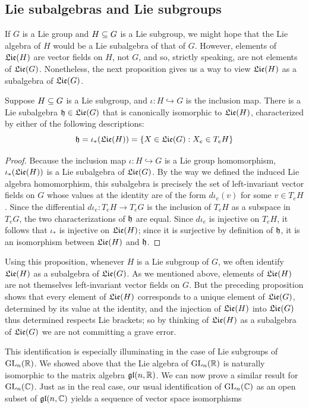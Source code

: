 \subsection{Lie subalgebras and Lie subgroups}
If $G$ is a Lie group and $H\subseteq G$ is a Lie subgroup, we might hope that the Lie algebra of $H$ would be a Lie subalgebra of that of $G$. However, elements of $\mathfrak{Lie}(H)$ are vector fields on $H$, not $G$, and so, strictly speaking, are not elements of $\mathfrak{Lie}(G)$. Nonetheless, the next proposition gives us a way to view $\mathfrak{Lie}(H)$ as a subalgebra of $\mathfrak{Lie}(G)$.
\begin{proposition}\label{Lie subalgebra}
Suppose $H\subseteq G$ is a Lie subgroup, and $\iota:H\hookrightarrow G$ is the inclusion map. There is a Lie subalgebra $\mathfrak{h}\in\mathfrak{Lie}(G)$ that is canonically isomorphic to $\mathfrak{Lie}(H)$, characterized by either of the following descriptions:
\[\mathfrak{h}=\iota_*(\mathfrak{Lie}(H))=\{X\in\mathfrak{Lie}(G):X_e\in T_eH\}\]
\end{proposition}
\begin{proof}
Because the inclusion map $\iota:H\hookrightarrow G$ is a Lie group homomorphism, $\iota_*(\mathfrak{Lie}(H))$ is a Lie subalgebra of $\mathfrak{Lie}(G)$. 
By the way we defined the induced Lie algebra homomorphism, this subalgebra is precisely the set of left-invariant vector fields on $G$ whose values at 
the identity are of the form $d\iota_e(v)$ for some $v\in T_eH$. Since the differential $d\iota_e:T_eH\to T_eG$ is the inclusion of $T_eH$ as a 
subspace in $T_eG$, the two characterizations of $\mathfrak{h}$ are equal. Since $d\iota_e$ is injective on $T_eH$, it follows that $\iota_*$ is injective 
on $\mathfrak{Lie}(H)$; since it is surjective by definition of $\mathfrak{h}$, it is an isomorphism between $\mathfrak{Lie}(H)$ and $\mathfrak{h}$.
\end{proof}
Using this proposition, whenever $H$ is a Lie subgroup of $G$, we often identify $\mathfrak{Lie}(H)$ as a subalgebra of $\mathfrak{Lie}(G)$. 
As we mentioned above, elements of $\mathfrak{Lie}(H)$ are not themselves left-invariant vector fields on $G$. But the preceding 
proposition shows that every element of $\mathfrak{Lie}(H)$ corresponds to a unique element of $\mathfrak{Lie}(G)$, determined by its value at the identity, and 
the injection of $\mathfrak{Lie}(H)$ into $\mathfrak{Lie}(G)$ thus determined respects Lie brackets; so by thinking of $\mathfrak{Lie}(H)$ as a subalgebra of $\mathfrak{Lie}(G)$ we are not 
committing a grave error.\par
This identification is especially illuminating in the case of Lie subgroups of $\mathrm{GL}_n(\mathbb{R})$. We showed above that the Lie algebra of $\mathrm{GL}_n(\mathbb{R})$ 
is naturally isomorphic to the matrix algebra $\mathfrak{gl}(n,\mathbb{R})$. We can now prove a similar result for $\mathrm{GL}_n(\mathbb{C})$. Just as in the real case, our usual identification of $\mathrm{GL}_n(\mathbb{C})$ as an open subset of $\mathfrak{gl}(n,\mathbb{C})$ yields a sequence of vector space isomorphisms
